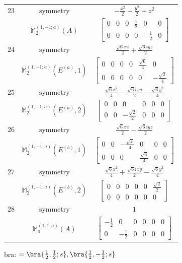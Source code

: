 \documentclass[fleqn,8pt,landscape]{jsarticle}
\begin{document}
\begin{longtable}{ccc}
$ 23 $ & $ \text{symmetry} $ & $ - \frac{x^{2}}{2} - \frac{y^{2}}{2} + z^{2} $ \\
$  $ & $ \mathbb{M}_{2}^{(1,-1;a)}(A) $ & $ \begin{bmatrix} 0 & 0 & 0 & \frac{1}{2} & 0 & 0 \\ 0 & 0 & 0 & 0 & - \frac{1}{2} & 0 \end{bmatrix} $ \\ \hline
$ 24 $ & $ \text{symmetry} $ & $ \frac{\sqrt{6} x z}{2} + \frac{\sqrt{6} i y z}{2} $ \\
$  $ & $ \mathbb{M}_{2}^{(1,-1;a)}(E^{(a)},1) $ & $ \begin{bmatrix} 0 & 0 & 0 & 0 & \frac{\sqrt{6}}{4} & 0 \\ 0 & 0 & 0 & 0 & 0 & - \frac{\sqrt{2}}{4} \end{bmatrix} $ \\ \hline
$ 25 $ & $ \text{symmetry} $ & $ \frac{\sqrt{6} x^{2}}{4} - \frac{\sqrt{6} i x y}{2} - \frac{\sqrt{6} y^{2}}{4} $ \\
$  $ & $ \mathbb{M}_{2}^{(1,-1;a)}(E^{(a)},2) $ & $ \begin{bmatrix} 0 & 0 & 0 & 0 & 0 & 0 \\ 0 & 0 & - \frac{\sqrt{2}}{2} & 0 & 0 & 0 \end{bmatrix} $ \\ \hline
$ 26 $ & $ \text{symmetry} $ & $ \frac{\sqrt{6} x z}{2} - \frac{\sqrt{6} i y z}{2} $ \\
$  $ & $ \mathbb{M}_{2}^{(1,-1;a)}(E^{(b)},1) $ & $ \begin{bmatrix} 0 & 0 & - \frac{\sqrt{2}}{4} & 0 & 0 & 0 \\ 0 & 0 & 0 & \frac{\sqrt{6}}{4} & 0 & 0 \end{bmatrix} $ \\ \hline
$ 27 $ & $ \text{symmetry} $ & $ \frac{\sqrt{6} x^{2}}{4} + \frac{\sqrt{6} i x y}{2} - \frac{\sqrt{6} y^{2}}{4} $ \\
$  $ & $ \mathbb{M}_{2}^{(1,-1;a)}(E^{(b)},2) $ & $ \begin{bmatrix} 0 & 0 & 0 & 0 & 0 & \frac{\sqrt{2}}{2} \\ 0 & 0 & 0 & 0 & 0 & 0 \end{bmatrix} $ \\ \hline
$ 28 $ & $ \text{symmetry} $ & $ 1 $ \\
$  $ & $ \mathbb{M}_{0}^{(1,1;a)}(A) $ & $ \begin{bmatrix} - \frac{1}{2} & 0 & 0 & 0 & 0 & 0 \\ 0 & - \frac{1}{2} & 0 & 0 & 0 & 0 \end{bmatrix} $ \\ \hline
\end{longtable}
bra: $=\bra{\frac{1}{2},\frac{1}{2};s}, \bra{\frac{1}{2},- \frac{1}{2};s}$
\end{document}
